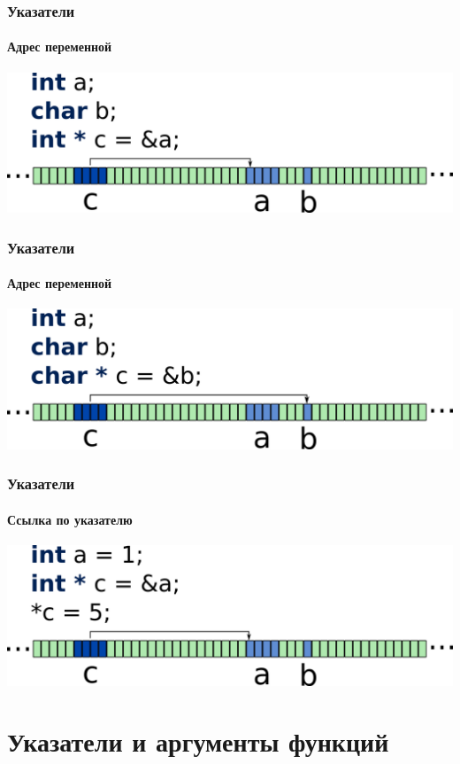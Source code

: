\documentclass[12pt,pdf,hyperref={unicode}]{beamer}
\begin{document}
\begin{frame}[fragile]
\frametitle{Указатели} 
\framesubtitle{Адрес переменной}
\begin{center}
\includegraphics[width=0.95\linewidth]{images/memory_pointer_2.png}
\end{center}
\end{frame}

\begin{frame}[fragile]
\frametitle{Указатели} 
\framesubtitle{Адрес переменной}
\begin{center}
\includegraphics[width=0.95\linewidth]{images/memory_pointer_3.png}
\end{center}
\end{frame}

\begin{frame}[fragile]
\frametitle{Указатели} 
\framesubtitle{Ссылка по указателю}
\begin{center}
\includegraphics[width=0.95\linewidth]{images/memory_pointer_4.png}
\end{center}
\end{frame}


\section{Указатели и аргументы функций}
\end{document}
